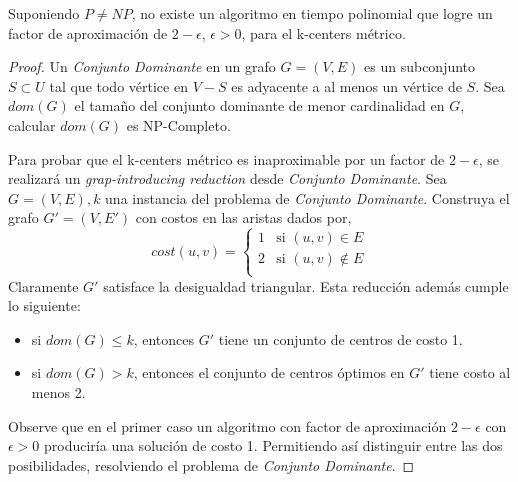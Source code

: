 \documentclass[../np-approximations.tex]{subfiles}
\begin{document}
\begin{theorem}
	Suponiendo $P \neq NP$, no existe un algoritmo en tiempo 
	polinomial que logre un factor de aproximación de $2-\epsilon$, 
	$\epsilon > 0$, para el k-centers métrico.
\end{theorem}

\begin{proof}
	Un \emph{Conjunto Dominante} en un grafo $G=(V,E)$ es un 
	subconjunto $S \subset U$ tal que todo vértice en $V - S$ es 
	adyacente a al menos un vértice de $S$. Sea $dom(G)$ el tamaño 
	del conjunto dominante de menor cardinalidad en $G$, calcular 
	$dom(G)$ es NP-Completo.
		
	    
	Para probar que el k-centers métrico es inaproximable por un 
	factor de $2-\epsilon$, se realizará un
	\emph{grap-introducing reduction} desde
	\emph{Conjunto Dominante}. Sea $G=(V,E), k$ una instancia del 
	problema de \emph{Conjunto Dominante}. Construya el grafo
	$G'=(V,E')$ con costos en las aristas dados por,
	\begin{equation*}
		cost(u,v)=
		\begin{cases}
			1 & \text{si $(u,v) \in E$}    \\
			2 & \text{si $(u,v) \notin E$} \\
		\end{cases}
	\end{equation*}
	Claramente $G'$ satisface la desigualdad triangular. Esta 
	reducción además cumple lo siguiente:
	\begin{itemize}
		\item si $dom(G) \le k$, entonces $G'$ tiene un conjunto de 
		      centros de costo 1.
		\item si $dom(G) > k$, entonces el conjunto de centros 
		      óptimos en $G'$ tiene costo al menos 2.
	\end{itemize}
	Observe que en el primer caso un algoritmo con factor de 
	aproximación $2-\epsilon$ con $\epsilon>0$ produciría una 
	solución de costo 1. Permitiendo así distinguir entre las dos 
	posibilidades, resolviendo el problema de
	\emph{Conjunto Dominante}.
\end{proof}
\end{document}
